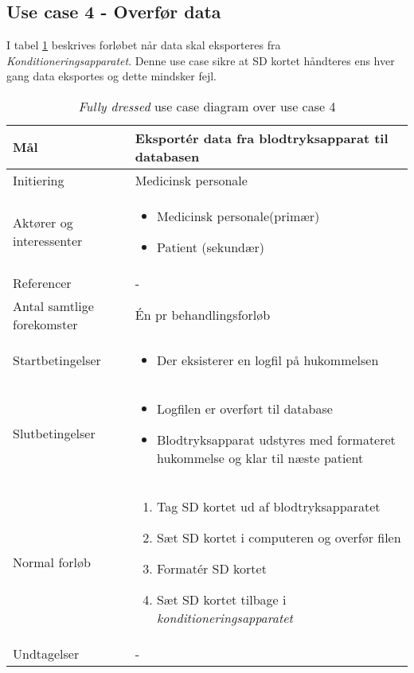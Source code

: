 	\subsection{Use case 4 - Overfør data}
	I tabel \ref{tab:uc4} beskrives forløbet når data skal eksporteres fra \textit{Konditioneringsapparatet}. Denne use case sikre at SD kortet håndteres ens hver gang data eksportes og dette mindsker fejl. 
	\begin{table}[H]
		\begin{center}
			\begin{tabular}{ | p{} | p{}| } 
				\hline
				Mål & Eksportér data fra blodtryksapparat til databasen\\ 
				\hline
				Initiering &  Medicinsk personale\\
				\hline
				Aktører og interessenter & 
				\begin{itemize}
					\item Medicinsk personale(primær)
					\item Patient (sekundær)
				\end{itemize} \\ 
				\hline
				Referencer & - \\ 
				\hline
				Antal samtlige forekomster & Én pr behandlingsforløb \\ 
				\hline	
				Startbetingelser & 
				\begin{itemize}
					\item Der eksisterer en logfil på hukommelsen
				\end{itemize} \\ 
				\hline
				Slutbetingelser & 
				\begin{itemize}
					\item Logfilen er overført til database
					\item Blodtryksapparat udstyres med formateret hukommelse og klar til næste patient
				\end{itemize} \\ 
				\hline
				Normal forløb & \begin{enumerate}
					\setlength\itemsep{0cm} %
					\item Tag SD kortet ud af blodtryksapparatet 
					\item Sæt SD kortet i computeren og overfør filen 
					\item Formatér SD kortet
					\item Sæt SD kortet tilbage i \textit{konditioneringsapparatet} 
				\end{enumerate} \\ 
				\hline
				Undtagelser & -\\ 
				\hline
			\end{tabular}
		\end{center}
		
			\caption{\textit{Fully dressed} use case diagram over use case 4} \label{tab:uc4}
		\end{table}
			\newpage